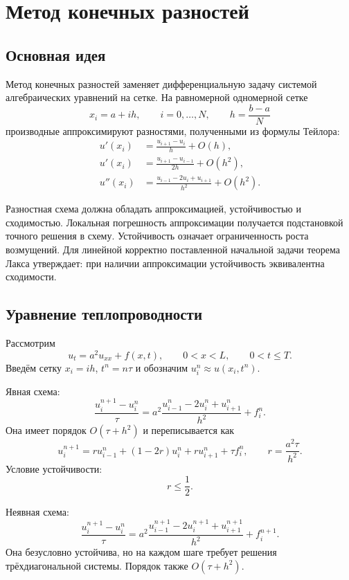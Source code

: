 \section{Метод конечных разностей}
\label{sec:finite-difference-method}

\subsection{Основная идея}

Метод конечных разностей заменяет дифференциальную задачу системой алгебраических
уравнений на сетке. На равномерной одномерной сетке
\[
    x_i=a+ih,
    \qquad i=0,\ldots,N,
    \qquad h=\frac{b-a}{N}
\]
производные аппроксимируют разностями, полученными из формулы Тейлора:
\[
\begin{aligned}
 u'(x_i)&=\frac{u_{i+1}-u_i}{h}+O(h),\\
 u'(x_i)&=\frac{u_{i+1}-u_{i-1}}{2h}+O(h^2),\\
 u''(x_i)&=\frac{u_{i-1}-2u_i+u_{i+1}}{h^2}+O(h^2).
\end{aligned}
\]

Разностная схема должна обладать аппроксимацией, устойчивостью и сходимостью.
Локальная погрешность аппроксимации получается подстановкой точного решения в
схему. Устойчивость означает ограниченность роста возмущений. Для линейной
корректно поставленной начальной задачи теорема Лакса утверждает: при наличии
аппроксимации устойчивость эквивалентна сходимости.

\subsection{Уравнение теплопроводности}

Рассмотрим
\[
    u_t=a^2u_{xx}+f(x,t),
    \qquad 0<x<L,
    \qquad 0<t\leq T.
\]
Введём сетку $x_i=ih$, $t^n=n\tau$ и обозначим
$u_i^n\approx u(x_i,t^n)$.

Явная схема:
\[
    \frac{u_i^{n+1}-u_i^n}{\tau}
    =a^2\frac{u_{i-1}^n-2u_i^n+u_{i+1}^n}{h^2}+f_i^n.
\]
Она имеет порядок $O(\tau+h^2)$ и переписывается как
\[
    u_i^{n+1}
    =r u_{i-1}^n+(1-2r)u_i^n+r u_{i+1}^n+\tau f_i^n,
    \qquad
    r=\frac{a^2\tau}{h^2}.
\]
Условие устойчивости:
\[
    r\leq\frac12.
\]

Неявная схема:
\[
    \frac{u_i^{n+1}-u_i^n}{\tau}
    =a^2\frac{u_{i-1}^{n+1}-2u_i^{n+1}+u_{i+1}^{n+1}}{h^2}+f_i^{n+1}.
\]
Она безусловно устойчива, но на каждом шаге требует решения трёхдиагональной
системы. Порядок также $O(\tau+h^2)$.


